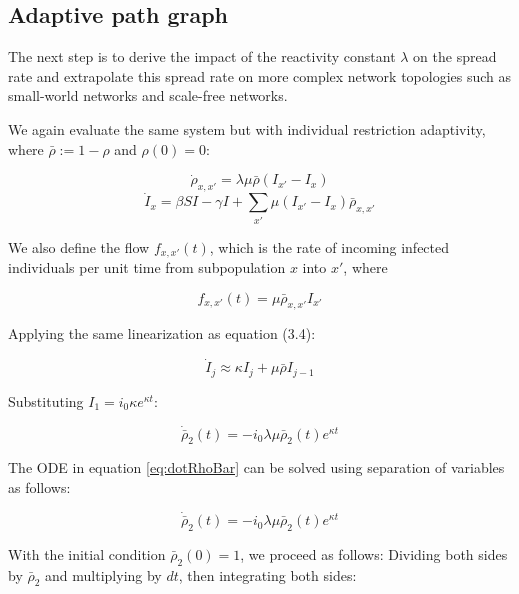 \subsection{Adaptive path graph}
The next step is to derive the impact of the reactivity constant $\lambda$ on the spread rate and extrapolate this spread rate on more complex network topologies such as small-world networks and scale-free networks.

We again evaluate the same system but with individual restriction adaptivity, where $\bar \rho := 1 - \rho$ and $\rho(0) = 0$:

\begin{equation}
\dot \rho_{x,x'} = \lambda \mu \bar \rho (I_{x'} - I_x)
\end{equation}
\begin{equation}
\dot I_x = \beta S I - \gamma I +  \sum_{x'} \mu (I_{x'} - I_x) \bar \rho_{x,x'}
\end{equation}

We also define the flow $f_{x,x'}(t)$, which is the rate of incoming infected individuals per unit time from subpopulation $x$ into $x'$, where 

\begin{equation}
f_{x,x'}(t) = \mu \bar \rho_{x,x'} I_{x'}
\end{equation}

Applying the same linearization as equation (3.4):

\begin{equation}
\dot I_j \approx \kappa I_j + \mu \bar \rho I_{j-1} 
\end{equation}

Substituting $I_1 = i_0 \kappa e^{\kappa t}$:

\begin{equation}
\dot{\bar{\rho}}_2(t) = - i_{0} \lambda \mu \bar \rho_{2}(t) e^{\kappa t}
\label{eq:dotRhoBar}
\end{equation}

The ODE in equation \ref{eq:dotRhoBar} can be solved using separation of variables as follows:

\begin{equation}
\dot{\bar{\rho}}_2(t) = - i_{0} \lambda \mu \bar \rho_{2}(t) e^{\kappa t}
\end{equation}

With the initial condition $\bar \rho_{2}(0) = 1$, we proceed as follows:
Dividing both sides by $\bar \rho_{2}$ and multiplying by $dt$, then integrating both sides:


